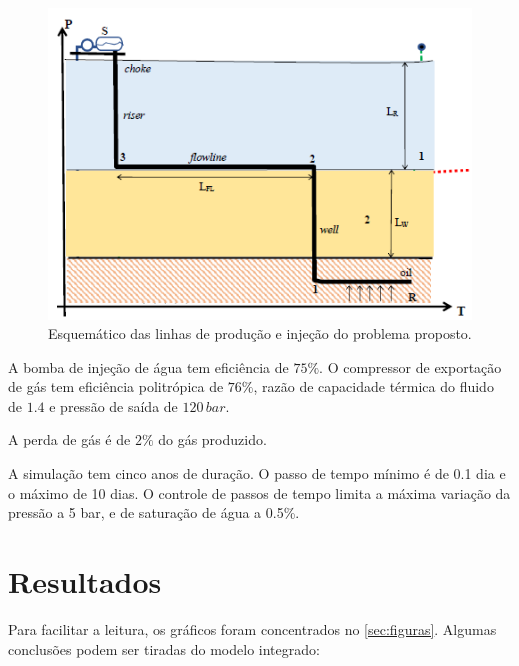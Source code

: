 \documentclass[final,5p]{elsarticle}
\numberwithin{equation}{section}
\begin{document}
        \begin{figure}
            \centering
            \includegraphics[width=0.9\linewidth]{flow_problem.png}
            \caption{Esquemático das linhas de produção e injeção do problema proposto.}
            \label{fig:desenhoflow}
        \end{figure}

        A bomba de injeção de água tem eficiência de $75\%$. O compressor de exportação de gás tem eficiência politrópica de $76\%$, razão de capacidade térmica do fluido de $1.4$ e pressão de saída de $120\,bar$.

        A perda de gás é de $2\%$ do gás produzido.

        A simulação tem cinco anos de duração. O passo de tempo mínimo é de 0.1 dia e o máximo de 10 dias. O controle de passos de tempo limita a máxima variação da pressão a 5 bar, e de saturação de água a 0.5\%.

    \section{Resultados}

        Para facilitar a leitura, os gráficos foram concentrados no \ref{sec:figuras}.
        Algumas conclusões podem ser tiradas do modelo integrado:
\end{document}
